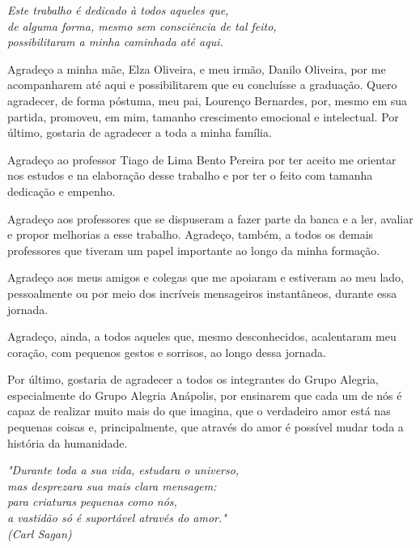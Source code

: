 \documentclass[
	12pt,				%
	openright,			%
    twoside,			%
	a4paper,			%
	english,			%
	french,				%
	spanish,			%
	brazil				%
	]{abntex2}
\numberwithin{lema}{chapter}
\numberwithin{teorema}{chapter}
\numberwithin{definicao}{chapter}
\numberwithin{exemplo}{chapter}
\numberwithin{figure}{chapter}
\begin{document}
\begin{dedicatoria}
	\vspace*{\fill}
	\centering
	\noindent
	\textit{
		Este trabalho é dedicado à todos aqueles que,\\
		de alguma forma, mesmo sem consciência de tal feito,\\
		possibilitaram a minha caminhada até aqui.
	} \vspace*{\fill}
\end{dedicatoria}

\begin{agradecimentos}[AGRADECIMENTOS]
Agradeço a minha mãe, Elza Oliveira, e meu irmão, Danilo Oliveira, por me acompanharem até aqui e possibilitarem que eu concluísse a graduação. Quero agradecer, de forma póstuma, meu pai, Lourenço Bernardes, por, mesmo em sua partida, promoveu, em mim, tamanho crescimento emocional e intelectual. Por último, gostaria de agradecer a toda a minha família.

Agradeço ao professor Tiago de Lima Bento Pereira por ter aceito me orientar nos estudos e na elaboração desse trabalho e por ter o feito com tamanha dedicação e empenho. 

Agradeço aos professores que se dispuseram a fazer parte da banca e a ler, avaliar e propor melhorias a esse trabalho. Agradeço, também, a todos os demais professores que tiveram um papel importante ao longo da minha formação.

Agradeço aos meus amigos e colegas que me apoiaram e estiveram ao meu lado, pessoalmente ou por meio dos incríveis mensageiros instantâneos, durante essa jornada. 

Agradeço, ainda, a todos aqueles que, mesmo desconhecidos, acalentaram meu coração, com pequenos gestos e sorrisos, ao longo dessa jornada.

Por último, gostaria de agradecer a todos os integrantes do Grupo Alegria, especialmente do Grupo Alegria Anápolis, por ensinarem que cada um de nós é capaz de realizar muito mais do que imagina, que o verdadeiro amor está nas pequenas coisas e, principalmente, que através do amor é possível mudar toda a história da humanidade.
\end{agradecimentos}

\begin{epigrafe}
    \vspace*{\fill}
	\begin{flushright}
		\textit{"Durante toda a sua vida, estudara o universo, \\
		mas desprezara sua mais clara mensagem:\\
		para criaturas pequenas como nós,\\
		a vastidão só é suportável através do amor." \\
		(Carl Sagan)}
	\end{flushright}
\end{epigrafe}
\end{document}
